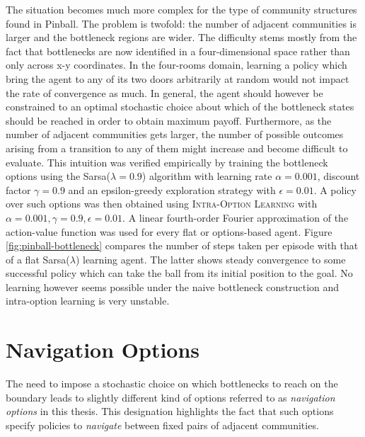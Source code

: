The situation becomes much more complex for the type of community structures found in Pinball. The problem is twofold: the number of adjacent communities is larger and the bottleneck regions are wider. The difficulty stems mostly from the fact that bottlenecks are now identified in a four-dimensional space rather than only across x-y coordinates. In the four-rooms domain, learning a policy which bring the agent to any of its two doors arbitrarily at random would not impact the rate of convergence as much. In general, the agent should however be constrained to an optimal stochastic choice about which of the bottleneck states should be reached in order to obtain maximum payoff. Furthermore, as the number of adjacent communities gets larger, the number of possible outcomes arising from a transition to any of them might increase and become difficult to evaluate. This intuition was verified empirically by training the bottleneck options using the Sarsa($\lambda = 0.9$) algorithm with learning rate $\alpha = 0.001$, discount factor $\gamma = 0.9$ and an epsilon-greedy exploration strategy with $\epsilon = 0.01$. A policy over such options was then obtained using \textsc{Intra-Option Learning} with $\alpha = 0.001, \gamma = 0.9, \epsilon = 0.01$. A linear fourth-order Fourier approximation of the action-value function was used for every flat or options-based agent. Figure \ref{fig:pinball-bottleneck} compares the number of steps taken per episode with that of a flat Sarsa($\lambda$) learning agent. The latter shows steady convergence to some successful policy which can take the ball from its initial position to the goal. No learning however seems possible under the naive bottleneck construction and intra-option learning is very unstable. 

\section{Navigation Options}

The need to impose a stochastic choice on which bottlenecks to reach on the boundary leads to slightly different kind of options referred to as \textit{navigation options} in this thesis. This designation highlights the fact that such options specify policies to \textit{navigate} between fixed pairs of adjacent communities.

